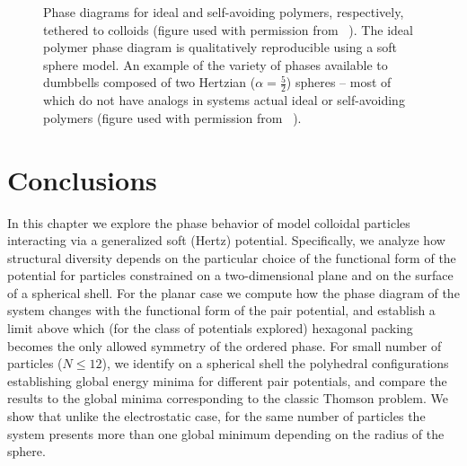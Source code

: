 {\begin{figure}
\begin{center}
	\end{center}
	\caption[Phase diagrams of different models of polymers tethered to colloids]{ Phase diagrams for ideal and self-avoiding polymers, respectively, tethered to colloids (figure used with permission from \citeauthor{bozorgui}~\cite{bozorgui}).  The ideal polymer phase diagram is qualitatively reproducible using a soft sphere model.    An example of the variety of phases available to dumbbells composed of two Hertzian ($\alpha = \frac{5}{2}$) spheres -- most of which do not have analogs in systems actual ideal or self-avoiding polymers (figure used with permission from \citeauthor{saric2}~\cite{saric2}).}\label{fig:limits}
\end{figure}


\section{Conclusions}
In this chapter we explore the phase behavior of {model} colloidal particles interacting via a generalized soft (Hertz) potential.
Specifically, we analyze how structural diversity depends on the particular choice of the functional form of the potential
for particles constrained on a two-dimensional plane and on the surface of a spherical shell.
For the planar case we compute how the  phase diagram of the system changes with the functional form of 
the pair potential, and establish a limit above which (for the class of potentials explored) hexagonal packing becomes the only 
allowed symmetry of the ordered phase.
For small number of particles ($N\leq 12$), we identify on a spherical shell the polyhedral 
configurations establishing global energy minima
for different pair potentials, and compare the results to the global minima 
corresponding to the classic Thomson problem. We show that unlike the electrostatic case, for the same number of 
particles the system presents more than one global minimum depending on the radius of the sphere.

}
